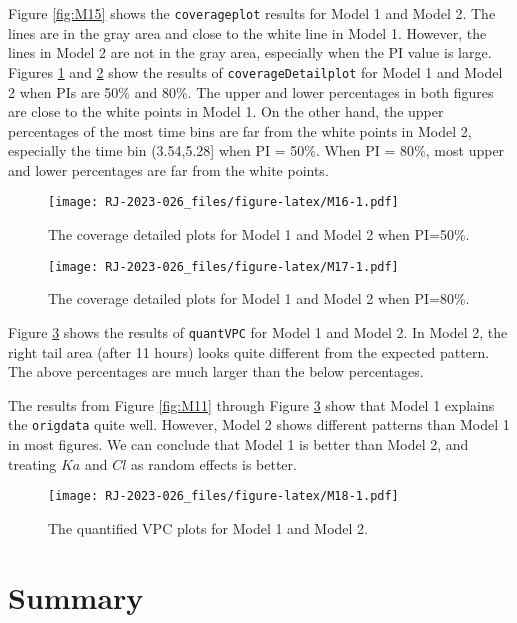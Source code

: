 Figure \ref{fig:M15} shows the \texttt{coverageplot} results for Model 1 and Model 2. The lines are in the gray area and close to the white line in Model 1. However, the lines in Model 2 are not in the gray area, especially when the PI value is large. Figures \ref{fig:M16} and \ref{fig:M17} show the results of \texttt{coverageDetailplot} for Model 1 and Model 2 when PIs are 50\(\%\) and 80\(\%\).
The upper and lower percentages in both figures are close to the white points in Model 1. On the other hand, the upper percentages of the most time bins are far from the white points in Model 2, especially the time bin (3.54,5.28{]} when PI = 50\(\%\). When PI = 80\(\%\), most upper and lower percentages are far from the white points.

\begin{figure}
\centering
\texttt{[image: RJ-2023-026\_files/figure-latex/M16-1.pdf]}
\caption{\label{fig:M16}The coverage detailed plots for Model 1 and Model 2 when PI=50\%.}
\end{figure}

\begin{figure}
\centering
\texttt{[image: RJ-2023-026\_files/figure-latex/M17-1.pdf]}
\caption{\label{fig:M17}The coverage detailed plots for Model 1 and Model 2 when PI=80\%.}
\end{figure}

Figure \ref{fig:M18} shows the results of \texttt{quantVPC} for Model 1 and Model 2. In Model 2, the right tail area (after 11 hours) looks quite different from the expected pattern. The above percentages are much larger than the below percentages.

The results from Figure \ref{fig:M11} through Figure \ref{fig:M18} show that Model 1 explains the \texttt{origdata} quite well. However, Model 2 shows different patterns than Model 1 in most figures. We can conclude that Model 1 is better than Model 2, and treating \(Ka\) and \(Cl\) as random effects is better.

\begin{figure}
\centering
\texttt{[image: RJ-2023-026\_files/figure-latex/M18-1.pdf]}
\caption{\label{fig:M18}The quantified VPC plots for Model 1 and Model 2.}
\end{figure}

\hypertarget{summary}{%
\section{Summary}\label{summary}}

